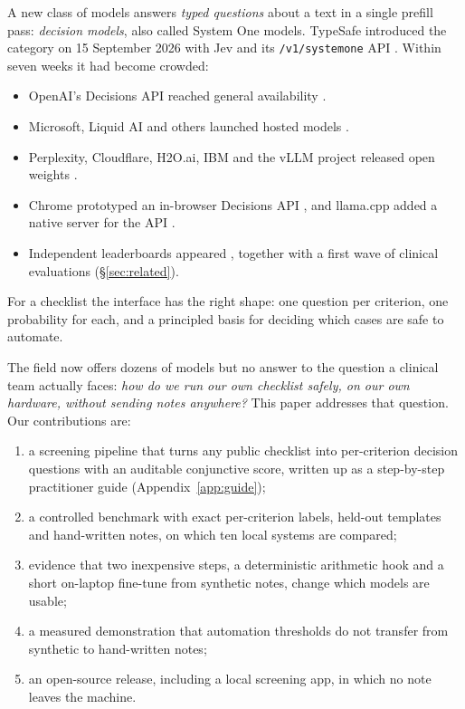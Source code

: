 \documentclass[11pt]{article}
\begin{document}
A new class of models answers \emph{typed questions} about a text in a single prefill pass: \emph{decision models}, also called System One models.
TypeSafe introduced the category on 15 September 2026 with Jev and its \texttt{/v1/systemone} API \citep{typesafe2026,typesafe_jev_docs}.
Within seven weeks it had become crowded:
\begin{itemize}[nosep]
\item OpenAI's Decisions API reached general availability \citep{openai_decisions}.
\item Microsoft, Liquid AI and others launched hosted models \citep{ms_decision1,liquid_d1}.
\item Perplexity, Cloudflare, H2O.ai, IBM and the vLLM project released open weights \citep{pplx_decider_v12,cloudflare_clef,h2o_lightning4b,granite_switch,vllmsr_decision2}.
\item Chrome prototyped an in-browser Decisions API \citep{chrome_decisions}, and llama.cpp added a native server for the API \citep{llamacpp_systemone}.
\item Independent leaderboards appeared \citep{decision_index,jevbench,aa_decision_index}, together with a first wave of clinical evaluations (\S\ref{sec:related}).
\end{itemize}
For a checklist the interface has the right shape: one question per criterion, one probability for each, and a principled basis for deciding which cases are safe to automate.

The field now offers dozens of models but no answer to the question a clinical team actually faces: \emph{how do we run our own checklist safely, on our own hardware, without sending notes anywhere?}
This paper addresses that question. Our contributions are:
\begin{enumerate}[nosep]
\item a screening pipeline that turns any public checklist into per-criterion decision questions with an auditable conjunctive score, written up as a step-by-step practitioner guide (Appendix~\ref{app:guide});
\item a controlled benchmark with exact per-criterion labels, held-out templates and hand-written notes, on which ten local systems are compared;
\item evidence that two inexpensive steps, a deterministic arithmetic hook and a short on-laptop fine-tune from synthetic notes, change which models are usable;
\item a measured demonstration that automation thresholds do not transfer from synthetic to hand-written notes;
\item an open-source release, including a local screening app, in which no note leaves the machine.
\end{enumerate}
\end{document}
